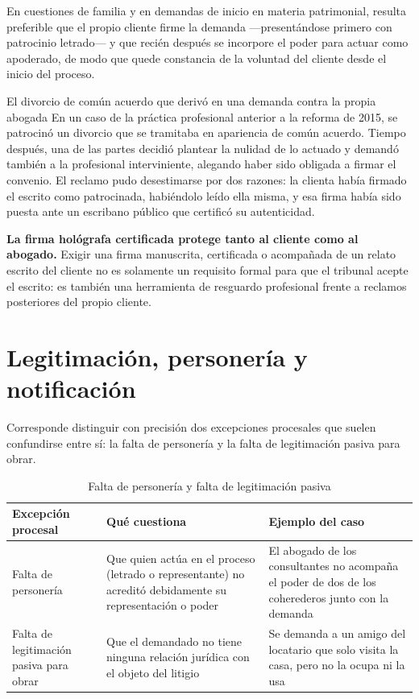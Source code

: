\documentclass[12pt,oneside]{book}
\begin{document}
En cuestiones de familia y en demandas de inicio en materia patrimonial, resulta preferible que el propio cliente firme la demanda —presentándose primero con patrocinio letrado— y que recién después se incorpore el poder para actuar como apoderado, de modo que quede constancia de la voluntad del cliente desde el inicio del proceso.

\begin{example}{El divorcio de común acuerdo que derivó en una demanda contra la propia abogada}
En un caso de la práctica profesional anterior a la reforma de 2015, se patrocinó un divorcio que se tramitaba en apariencia de común acuerdo. Tiempo después, una de las partes decidió plantear la nulidad de lo actuado y demandó también a la profesional interviniente, alegando haber sido obligada a firmar el convenio. El reclamo pudo desestimarse por dos razones: la clienta había firmado el escrito como patrocinada, habiéndolo leído ella misma, y esa firma había sido puesta ante un escribano público que certificó su autenticidad.
\end{example}

\begin{important}
\textbf{La firma hológrafa certificada protege tanto al cliente como al abogado.} Exigir una firma manuscrita, certificada o acompañada de un relato escrito del cliente no es solamente un requisito formal para que el tribunal acepte el escrito: es también una herramienta de resguardo profesional frente a reclamos posteriores del propio cliente.
\end{important}

\section{Legitimación, personería y notificación}

Corresponde distinguir con precisión dos excepciones procesales que suelen confundirse entre sí: la falta de personería y la falta de legitimación pasiva para obrar.

\begin{table}[H]
\centering
\caption{Falta de personería y falta de legitimación pasiva}
\begin{tabularx}{\textwidth}{>{\raggedright\arraybackslash}p{} >{\raggedright\arraybackslash}p{} X}
\toprule
\textbf{Excepción procesal} & \textbf{Qué cuestiona} & \textbf{Ejemplo del caso} \\
\midrule
Falta de personería & Que quien actúa en el proceso (letrado o representante) no acreditó debidamente su representación o poder & El abogado de los consultantes no acompaña el poder de dos de los coherederos junto con la demanda \\
Falta de legitimación pasiva para obrar & Que el demandado no tiene ninguna relación jurídica con el objeto del litigio & Se demanda a un amigo del locatario que solo visita la casa, pero no la ocupa ni la usa \\
\bottomrule
\end{tabularx}
\end{table}
\end{document}
